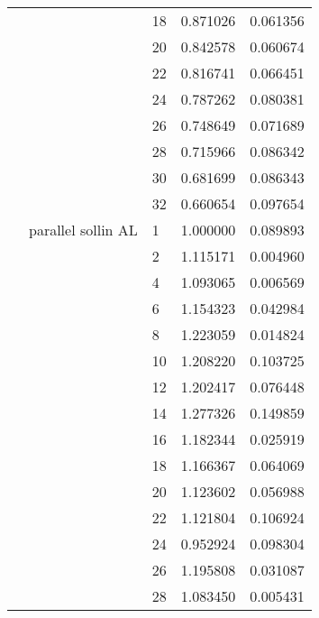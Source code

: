 \begin{tabular}{lllrr}
                      &                     & 18 &  0.871026 &  0.061356 \\
                      &                     & 20 &  0.842578 &  0.060674 \\
                      &                     & 22 &  0.816741 &  0.066451 \\
                      &                     & 24 &  0.787262 &  0.080381 \\
                      &                     & 26 &  0.748649 &  0.071689 \\
                      &                     & 28 &  0.715966 &  0.086342 \\
                      &                     & 30 &  0.681699 &  0.086343 \\
                      &                     & 32 &  0.660654 &  0.097654 \\
                      & parallel sollin AL & 1  &  1.000000 &  0.089893 \\
                      &                     & 2  &  1.115171 &  0.004960 \\
                      &                     & 4  &  1.093065 &  0.006569 \\
                      &                     & 6  &  1.154323 &  0.042984 \\
                      &                     & 8  &  1.223059 &  0.014824 \\
                      &                     & 10 &  1.208220 &  0.103725 \\
                      &                     & 12 &  1.202417 &  0.076448 \\
                      &                     & 14 &  1.277326 &  0.149859 \\
                      &                     & 16 &  1.182344 &  0.025919 \\
                      &                     & 18 &  1.166367 &  0.064069 \\
                      &                     & 20 &  1.123602 &  0.056988 \\
                      &                     & 22 &  1.121804 &  0.106924 \\
                      &                     & 24 &  0.952924 &  0.098304 \\
                      &                     & 26 &  1.195808 &  0.031087 \\
                      &                     & 28 &  1.083450 &  0.005431 \\

\end{tabular}
